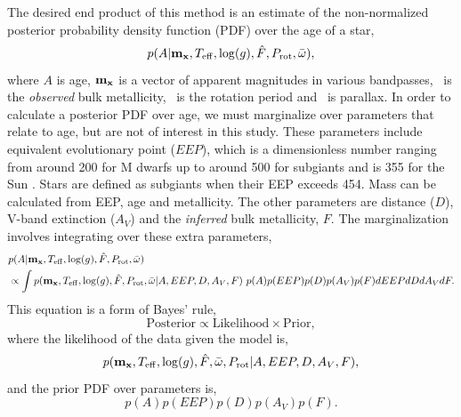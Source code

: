 The desired end product of this method is an estimate of the non-normalized
posterior probability density function (PDF) over the age of a star,
\begin{equation} \label{eqn:eqn1}
    p(A|{\bf m_x}, T_{\mathrm{eff}}, \log(g), \hat{F},
    P_{\mathrm{rot}}, \bar{\omega}),
\end{equation}
where $A$ is age, ${\bf m_x}$ is a vector of
apparent magnitudes in various bandpasses, \fhat\ is the {\it observed} bulk
metallicity, \prot\ is the rotation period and \pmega\ is parallax.
In order to calculate a posterior PDF over age, we must marginalize over
parameters that relate to age, but are not of interest in this study.
These parameters include equivalent evolutionary point ($EEP$), which is a
dimensionless number ranging from around 200 for M dwarfs up to around 500 for
subgiants and is 355 for the Sun \citep[see][]{dotter2016, choi2016}.
Stars are defined as subgiants when their EEP exceeds 454.
Mass can be calculated from EEP, age and metallicity.
The other parameters are distance ($D$), V-band extinction ($A_V$) and the
{\it inferred} bulk metallicity, $F$.
The marginalization involves integrating over these extra parameters,
\begin{eqnarray} \label{eqn:bayes}
    & p(A|{\bf m_x}, T_{\mathrm{eff}}, \log(g), \hat{F},
    P_{\mathrm{rot}}, \bar{\omega})
\\ \nonumber
    & \propto \int p({\bf m_x}, T_{\mathrm{eff}}, \log(g), \hat{F},
    P_\mathrm{rot}, \bar{\omega}|
    A, EEP, D, A_V, F)~p(A)p(EEP)p(D)p(A_V)p(F)dEEPdDdA_VdF.
\end{eqnarray}
This equation is a form of Bayes' rule,
\begin{equation} \label{eqn:eqn2}
\mathrm{Posterior} \propto \mathrm{Likelihood} \times \mathrm{Prior},
\end{equation}
where the likelihood of the data given the model is,
\begin{equation} \label{eqn:full_likelihood}
    p({\bf m_x}, T_{\mathrm{eff}}, \log(g), \hat{F}, \bar{\omega},
    P_{\mathrm{rot}}|A, EEP, D, A_V, F),
\end{equation}
and the prior PDF over parameters is,
\begin{equation} \label{eqn:prior}
    p(A)p(EEP)p(D)p(A_V)p(F).
\end{equation}

